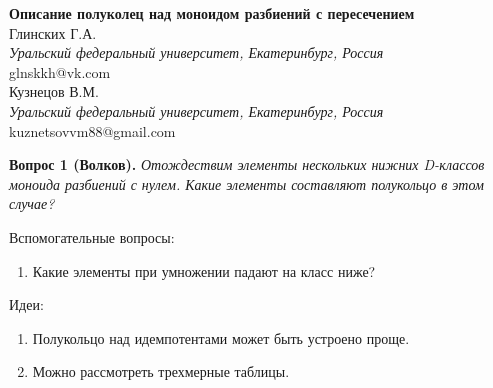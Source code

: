 \documentclass[a4paper,14pt]{article}
\begin{document}
\pagestyle{fancy}
\fancyhead{}
\fancyfoot{}
\fancyfoot[R]{\footnotesize{}}
\renewcommand{\footrulewidth}{0.1 mm}

\begin{center}
\textbf{Описание полуколец над моноидом разбиений с пересечением}\\
\vspace{\baselineskip}
Глинских Г.А.\\
\emph{Уральский федеральный университет, Екатеринбург, Россия}\\glnskkh@vk.com
\vspace{\baselineskip}\\

\vspace{\baselineskip}
Кузнецов В.М.\\
\emph{Уральский федеральный университет, Екатеринбург, Россия}\\kuznetsovvm88@gmail.com
\vspace{\baselineskip}\\
\end{center}
\vspace{\baselineskip}


\medskip

\textbf{Вопрос 1 (Волков).} {\sl Отождествим элементы нескольких нижних D-классов моноида разбиений с нулем. Какие элементы составляют полукольцо в этом случае?}

Вспомогательные вопросы:
\begin{enumerate}
    \item Какие элементы при умножении падают на класс ниже?
\end{enumerate}

Идеи:
\begin{enumerate}
    \item Полукольцо над идемпотентами может быть устроено проще.
    \item Можно рассмотреть трехмерные таблицы.
\end{enumerate}

\medskip
\end{document}
